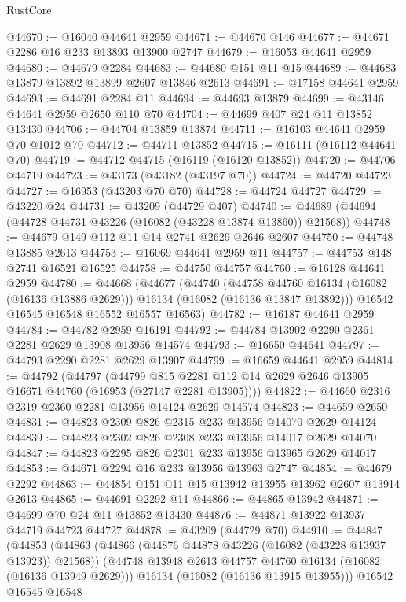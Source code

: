 \begin{lexlean}{RustCore}
\begin{coremodule}
@44670 := @16040 @44641 @2959
@44671 := @44670 @146
@44677 := @44671 @2286 @16 @233 @13893 @13900 @2747
@44679 := @16053 @44641 @2959
@44680 := @44679 @2284
@44683 := @44680 @151 @11 @15
@44689 := @44683 @13879 @13892 @13899 @2607 @13846 @2613
@44691 := @17158 @44641 @2959
@44693 := @44691 @2284 @11
@44694 := @44693 @13879
@44699 := @43146 @44641 @2959 @2650 @110 @70
@44704 := @44699 @407 @24 @11 @13852 @13430
@44706 := @44704 @13859 @13874
@44711 := @16103 @44641 @2959 @70 @1012 @70
@44712 := @44711 @13852
@44715 := @16111 (@16112 @44641 @70)
@44719 := @44712 @44715 (@16119 (@16120 @13852))
@44720 := @44706 @44719
@44723 := @43173 (@43182 (@43197 @70))
@44724 := @44720 @44723
@44727 := @16953 (@43203 @70 @70)
@44728 := @44724 @44727
@44729 := @43220 @24
@44731 := @43209 (@44729 @407)
@44740 := @44689 (@44694 (@44728 @44731 @43226 (@16082 (@43228 @13874 @13860)) @21568))
@44748 := @44679 @149 @112 @11 @14 @2741 @2629 @2646 @2607
@44750 := @44748 @13885 @2613
@44753 := @16069 @44641 @2959 @11
@44757 := @44753 @148 @2741 @16521 @16525
@44758 := @44750 @44757
@44760 := @16128 @44641 @2959
@44780 := @44668
    (@44677
      (@44740
        (@44758 @44760 @16134 (@16082 (@16136 @13886 @2629)))
        @16134
        (@16082 (@16136 @13847 @13892)))
      @16542
      @16545
      @16548
      @16552
      @16557
      @16563)
@44782 := @16187 @44641 @2959
@44784 := @44782 @2959 @16191
@44792 := @44784 @13902 @2290 @2361 @2281 @2629 @13908 @13956 @14574
@44793 := @16650 @44641
@44797 := @44793 @2290 @2281 @2629 @13907
@44799 := @16659 @44641 @2959
@44814 := @44792
    (@44797
      (@44799 @815 @2281 @112 @14 @2629 @2646 @13905 @16671 @44760 (@16953 (@27147 @2281 @13905))))
@44822 := @44660 @2316 @2319 @2360 @2281 @13956 @14124 @2629 @14574
@44823 := @44659 @2650
@44831 := @44823 @2309 @826 @2315 @233 @13956 @14070 @2629 @14124
@44839 := @44823 @2302 @826 @2308 @233 @13956 @14017 @2629 @14070
@44847 := @44823 @2295 @826 @2301 @233 @13956 @13965 @2629 @14017
@44853 := @44671 @2294 @16 @233 @13956 @13963 @2747
@44854 := @44679 @2292
@44863 := @44854 @151 @11 @15 @13942 @13955 @13962 @2607 @13914 @2613
@44865 := @44691 @2292 @11
@44866 := @44865 @13942
@44871 := @44699 @70 @24 @11 @13852 @13430
@44876 := @44871 @13922 @13937 @44719 @44723 @44727
@44878 := @43209 (@44729 @70)
@44910 := @44847
    (@44853
      (@44863
        (@44866 (@44876 @44878 @43226 (@16082 (@43228 @13937 @13923)) @21568))
        (@44748 @13948 @2613 @44757 @44760 @16134 (@16082 (@16136 @13949 @2629)))
        @16134
        (@16082 (@16136 @13915 @13955)))
      @16542
      @16545
      @16548

\end{coremodule}
\end{lexlean}
